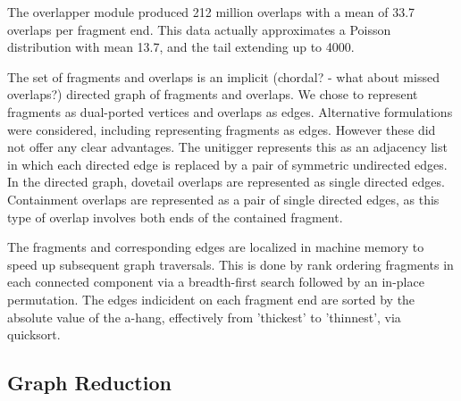 \documentclass{article}
\begin{document}




The overlapper module produced 212 million overlaps with a mean of
33.7 overlaps per fragment end. This data actually approximates a
Poisson distribution with mean 13.7, and the tail extending up to
4000.

  The set of fragments and overlaps is an implicit (chordal? - what
about missed overlaps?) directed graph of fragments and overlaps. We
chose to represent fragments as dual-ported vertices and overlaps as
edges. Alternative formulations were considered, including
representing fragments as edges. However these did not offer any clear
advantages. The unitigger represents this as an adjacency list in
which each directed edge is replaced by a pair of symmetric undirected
edges. In the directed graph, dovetail overlaps are represented as
single directed edges. Containment overlaps are represented as a pair
of single directed edges, as this type of overlap involves both ends
of the contained fragment.

  The fragments and corresponding edges are localized in machine
memory to speed up subsequent graph traversals. This is done by rank
ordering fragments in each connected component via a breadth-first
search followed by an in-place permutation. The edges indicident on
each fragment end are sorted by the absolute value of the a-hang,
effectively from 'thickest' to 'thinnest', via quicksort.

\subsection{Graph Reduction}
%
%
%
%
\end{document}
